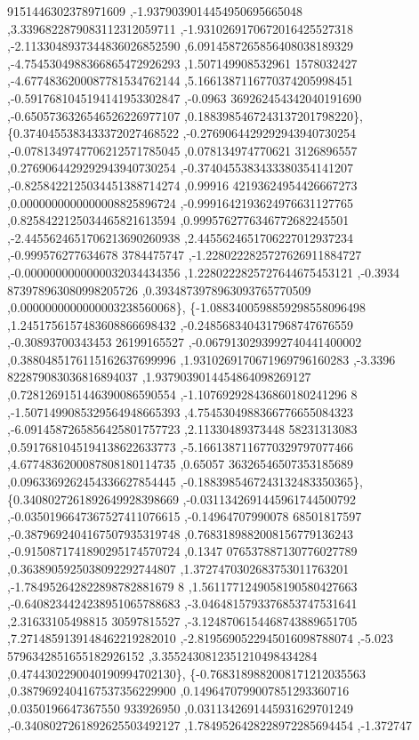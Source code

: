 \begin{DoxyCode}
      9151446302378971609 ,-1.9379039014454950695665048 ,3.3396822879083112312059711 ,-1.9310269170672016425527318
       ,-2.1133048937344836026852590 ,6.0914587265856408038189329 ,-4.7545304988366865472926293 ,1.507149908532961
      1578032427 ,-4.6774836200087781534762144 ,5.1661387116770374205998451 ,-0.5917681045194141953302847 ,-0.0963
      369262454342040191690 ,-0.6505736326546526226977107 ,0.1883985467243137201798220\},
\{0.3740455383433372027468522 ,-0.2769064429292943940730254 ,-0.0781349747706212571785045 ,0.078134974770621
      3126896557 ,0.2769064429292943940730254 ,-0.3740455383433380354141207 ,-0.8258422125034451388714274 ,0.99916
      42193624954426667273 ,0.0000000000000008825896724 ,-0.9991642193624976631127765 ,0.8258422125034465821613594
       ,0.9995762776346772682245501 ,-2.4455624651706213690260938 ,2.4455624651706227012937234 ,-0.999576277634678
      3784475747 ,-1.2280222825727626911884727 ,-0.0000000000000032034434356 ,1.2280222825727644675453121 ,-0.3934
      873978963080998205726 ,0.3934873978963093765770509 ,0.0000000000000003238560068\},
\{-1.0883400598859298558096498 ,1.2451756157483608866698432 ,-0.2485683404317968747676559 ,-0.30893700343453
      26199165527 ,-0.0679130293992740441400002 ,0.3880485176115162637699996 ,1.9310269170671969796160283 ,-3.3396
      822879083036816894037 ,1.9379039014454864098269127 ,0.7281269151446390086590554 ,-1.107692928436860180241296
      8 ,-1.5071499085329564948665393 ,4.7545304988366776655084323 ,-6.0914587265856425801757723 ,2.11330489373448
      58231313083 ,0.5917681045194138622633773 ,-5.1661387116770329797077466 ,4.6774836200087808180114735 ,0.65057
      36326546507353185689 ,0.0963369262454336627854445 ,-0.1883985467243132483350365\},
\{0.3408027261892649928398669 ,-0.0311342691445961744500792 ,-0.0350196647367527411076615 ,-0.14964707990078
      68501817597 ,-0.3879692404167507935319748 ,0.7683189882008156779136243 ,-0.9150871741890295174570724 ,0.1347
      076537887130776027789 ,0.3638905925038092292744807 ,1.3727470302683753011763201 ,-1.784952642822898782881679
      8 ,1.5611771249058190580427663 ,-0.6408234424238951065788683 ,-3.0464815793376853747531641 ,2.31633105498815
      30597815527 ,-3.1248706154468743889651705 ,7.2714859139148462219282010 ,-2.8195690522945016098788074 ,-5.023
      5796342851655182926152 ,3.3552430812351210498434284 ,0.4744302290040190994702130\},
\{-0.7683189882008171212035563 ,0.3879692404167537356229900 ,0.1496470799007851293360716 ,0.0350196647367550
      933926950 ,0.0311342691445931629701249 ,-0.3408027261892625503492127 ,1.7849526428228972285694454 ,-1.372747

\end{DoxyCode}
